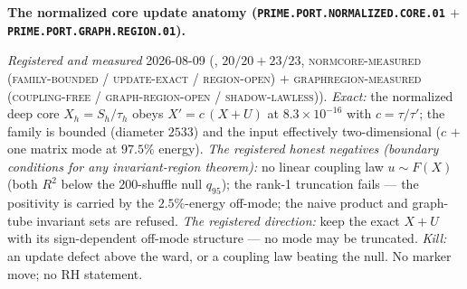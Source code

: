 \par\smallskip\noindent\textbf{The normalized core update
anatomy (\texttt{PRIME.PORT.NORMALIZED.\allowbreak CORE.01} $+$
\texttt{PRIME.PORT.GRAPH.\allowbreak REGION.01}).}
{\sloppy
\emph{Registered and measured} 2026-08-09
(, $20/20 + 23/23$,
\textsc{normcore-measured (family-bounded / update-exact /
region-open)} $+$ \textsc{graphregion-measured (coupling-free /
graph-region-open / shadow-lawless)}).  \emph{Exact:} the
normalized deep core $X_h = S_h/\tau_h$ obeys $X' = c\,(X + U)$
at $8.3\times10^{-16}$ with $c = \tau/\tau'$; the family is
bounded (diameter $2533$) and the input effectively
two-dimensional ($c$ $+$ one matrix mode at $97.5\%$ energy).
\emph{The registered honest negatives (boundary conditions for
any invariant-region theorem):} no linear coupling law $u \sim
F(X)$ (both $R^{2}$ below the $200$-shuffle null $q_{95}$); the
rank-1 truncation fails --- the positivity is carried by the
$2.5\%$-energy off-mode; the naive product and graph-tube
invariant sets are refused.  \emph{The registered direction:}
keep the exact $X + U$ with its sign-dependent off-mode
structure --- no mode may be truncated.  \emph{Kill:} an update
defect above the ward, or a coupling law beating the null.  No
marker move; no RH statement.\par}


